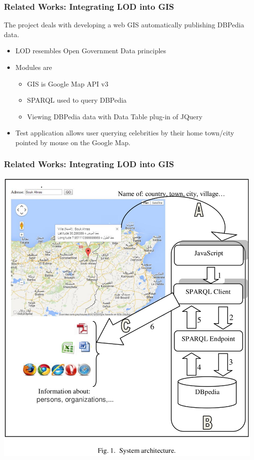 \documentclass[10pt]{beamer}
\begin{document}
\begin{frame}
  \frametitle{Related Works: Integrating LOD into GIS}
  The project \cite{abid} deals with developing a web GIS automatically publishing DBPedia data.
  \begin{itemize}
  \item LOD resembles Open Government Data principles
  \item Modules are
    \begin{itemize}
    \item GIS is Google Map API v3
    \item SPARQL used to query DBPedia
    \item Viewing DBPedia data with Data Table plug-in of JQuery
    \end{itemize}
  \item Test application allows user querying celebrities by their home town/city pointed by mouse on the Google Map.
  \end{itemize}
\end{frame}

\begin{frame}
  \frametitle{Related Works: Integrating LOD into GIS}
  \centering
  \includegraphics[width=\linewidth]{integrating-lod-gis-arch.png}
\end{frame}
\end{document}
